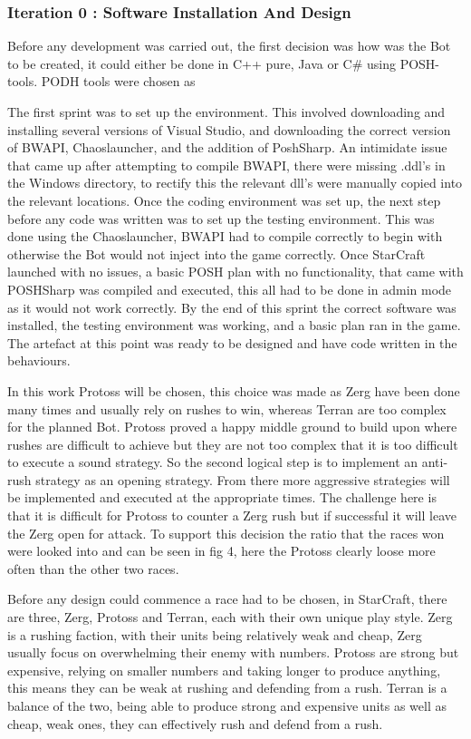 \documentclass[journal]{IEEEtran}
\begin{document}
\subsubsection{Iteration 0 : Software Installation And Design}
Before any development was carried out, the first decision was how was the Bot to be created, it could either be done in C++ pure, Java or C\# using POSH-tools. PODH tools were chosen as
 
The first sprint was to set up the environment. This involved downloading and installing several versions of Visual Studio, and downloading the correct version of BWAPI, Chaoslauncher, and the addition of PoshSharp. An intimidate issue that came up after attempting to compile BWAPI, there were missing .ddl's in the Windows directory, to rectify this the relevant dll's were manually copied into the relevant locations. Once the coding environment was set up, the next step before any code was written was to set up the testing environment. This was done using the Chaoslauncher, BWAPI had to compile correctly to begin with otherwise the Bot would not inject into the game correctly. Once StarCraft launched with no issues, a basic POSH plan with no functionality, that came with POSHSharp was compiled and executed, this all had to be done in admin mode as it would not work correctly. By the end of this sprint the correct software was installed, the testing environment was working, and a basic plan ran in the game. The artefact at this point was ready to be designed and have code written in the behaviours.

In this work Protoss will be chosen, this choice was made as Zerg have been done many times and usually rely on rushes to win, whereas Terran are too complex for the planned Bot. Protoss proved a happy middle ground to build upon where rushes are difficult to achieve but they are not too complex that it is too difficult to execute a sound strategy. So the second logical step is to implement an anti-rush strategy as an opening strategy. From there more aggressive strategies will be implemented and executed at the appropriate times. The challenge here is that it is difficult for Protoss to counter a Zerg rush but if successful it will leave the Zerg open for attack. To support this decision the ratio that the races won were looked into and can be seen in fig 4, here the Protoss clearly loose more often than the other two races.

Before any design could commence a race had to be chosen, in StarCraft, there are three, Zerg, Protoss and Terran, each with their own unique play style. Zerg is a rushing faction, with their units being relatively weak and cheap, Zerg usually focus on overwhelming their enemy with numbers. Protoss are strong but expensive, relying on smaller numbers and taking longer to produce anything, this means they can be weak at rushing and defending from a rush. Terran is a balance of the two, being able to produce strong and expensive units as well as cheap, weak ones, they can effectively rush and defend from a rush.
\end{document}
